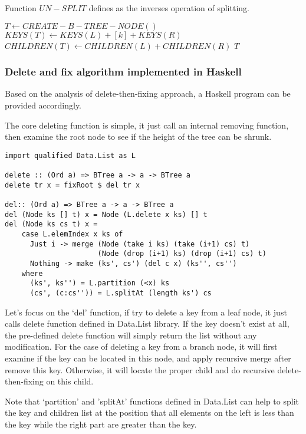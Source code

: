 \documentclass{article}
\begin{document}
Function $UN-SPLIT$ defines as the inverses operation of splitting.

\begin{algorithmic}[1]
  \State $T \gets CREATE-B-TREE-NODE()$
  \State $KEYS(T) \gets KEYS(L)+[k]+KEYS(R)$
  \State $CHILDREN(T) \gets CHILDREN(L)+CHILDREN(R)$
  \State \Return $T$
\EndFunction
\end{algorithmic}

\subsubsection{Delete and fix algorithm implemented in Haskell}
Based on the analysis of delete-then-fixing approach, a Haskell
program can be provided accordingly.

The core deleting function is simple, it just call an internal
removing function, then examine the root node to see if the
height of the tree can be shrunk.

\lstset{language=Haskell}
\begin{lstlisting}
import qualified Data.List as L

delete :: (Ord a) => BTree a -> a -> BTree a
delete tr x = fixRoot $ del tr x

del:: (Ord a) => BTree a -> a -> BTree a
del (Node ks [] t) x = Node (L.delete x ks) [] t
del (Node ks cs t) x =
    case L.elemIndex x ks of
      Just i -> merge (Node (take i ks) (take (i+1) cs) t)
                      (Node (drop (i+1) ks) (drop (i+1) cs) t)
      Nothing -> make (ks', cs') (del c x) (ks'', cs'')
    where
      (ks', ks'') = L.partition (<x) ks
      (cs', (c:cs'')) = L.splitAt (length ks') cs
\end{lstlisting} %

Let's focus on the `del' function, if try to delete a key from
a leaf node, it just calls delete function defined in Data.List
library. If the key doesn't exist at all, the pre-defined
delete function will simply return the list without any modification.
For the case of deleting a key from a branch node, it will first examine
if the key can be located in this node, and apply recursive merge
after remove this key. Otherwise, it will locate the proper child
and do recursive delete-then-fixing on this child.

Note that `partition' and 'splitAt' functions defined in Data.List
can help to split the key and children list at the position that
all elements on the left is less than the key while the right part
are greater than the key.
\end{document}
